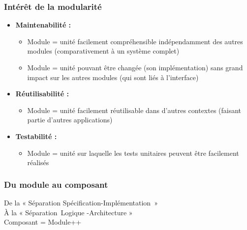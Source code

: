\documentclass{beamer}
\begin{document}
\begin{frame}
  \frametitle{Intérêt de la modularité}  
  \begin{itemize}
  \item  \textbf{Maintenabilité :}
    \begin{itemize}
    \item Module = unité facilement compréhensible indépendamment des
      autres modules (comparativement à un système complet)
      \item Module =
      unité pouvant être changée (son implémentation) sans grand
      impact sur les autres modules (qui sont liés à l'interface)
    \end{itemize}
    \item \textbf{Réutilisabilité :}
    \begin{itemize}      
    \item Module = unité facilement réutilisable dans d'autres
      contextes (faisant partie d'autres applications)
    \end{itemize}
  \item \textbf{Testabilité :}
    \begin{itemize}      
    \item Module = unité sur laquelle les tests unitaires peuvent être
      facilement réalisés
    \end{itemize}
  \end{itemize}
\end{frame}

\begin{frame}
  \frametitle{Du module au composant}
      \begin{center}  
 De la « Séparation Spécification-Implémentation »\\
\vspace{3cm}    
 À la « Séparation Logique -Architecture »\\
\vspace{1cm}
Composant = Module++

  \end{center}
\end{frame}
\end{document}
